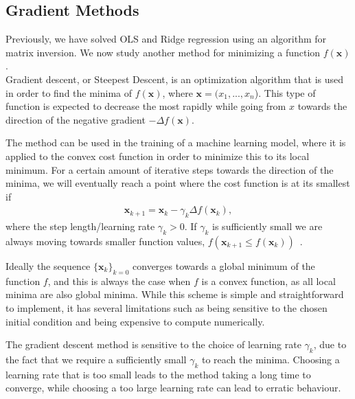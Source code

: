 \documentclass[english,notitlepage,reprint,nofootinbib]{revtex4-2}  %
\begin{document}
\subsection*{Gradient Methods}
Previously, we have solved OLS and Ridge regression using an algorithm for matrix inversion. 
We now study another method for minimizing a function $f(\boldsymbol{x})$. 
\vspace{3mm}
\\ 
Gradient descent, or Steepest Descent, is an optimization algorithm that is used in order to find the minima of $f(\boldsymbol{x})$, where $\boldsymbol{x} = (x_1, ..., x_n$). This type of function is expected to decrease the most rapidly while going from $x$ towards the direction of the negative gradient $-\Delta f(\boldsymbol{x})$. 

The method can be used in the training of a machine learning model, where it is applied to the convex cost function in order to minimize this to its local minimum. 
For a certain amount of iterative steps towards the direction of the minima, we will eventually reach a point where the cost function is at its smallest if 
\begin{align}
    \boldsymbol{x}_{k+1} = \boldsymbol{x}_k - \gamma_k \Delta f(\boldsymbol{x}_k), \nonumber 
\end{align}
where the step length/learning rate $\gamma_k > 0$. If $\gamma_k$ is sufficiently small we are always moving towards smaller function values, $f(\boldsymbol{x}_{k+1} \leq f(\boldsymbol{x}_k))$~\cite{lecture_notes}. 

Ideally the sequence $\{\boldsymbol{x}_k\}_{k=0}$ converges towards a global minimum of the function $f$, and this is always the case when $f$ is a convex function, as all local minima are also global minima. While this scheme is simple and straightforward to implement, it has several limitations such as being sensitive to the chosen initial condition and being expensive to compute numerically.

The gradient descent method is sensitive to the choice of learning rate $\gamma_k$, due to the fact that we require a sufficiently small $\gamma_k$ to reach the minima. Choosing a learning rate that is too small leads to the method taking a long time to converge, while choosing a too large learning rate can lead to erratic behaviour. 
\end{document}
